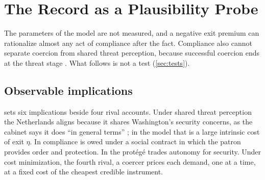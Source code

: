 \section{The Record as a Plausibility Probe}\label{sec:evidence}

The parameters of the model are not measured, and a negative exit premium can rationalize almost any act of compliance after the fact. Compliance also cannot separate coercion from shared threat perception, because successful coercion ends at the threat stage \citep{drezner2003hidden}. What follows is not a test (\cref{sec:tests}).

\subsection{Observable implications}\label{sec:predictions}

 sets six implications beside four rival accounts. Under shared threat perception the Netherlands aligns because it shares Washington's security concerns, as the cabinet says it does ``in general terms'' \citep[our translation]{tk2026match}; in the model that is a large intrinsic cost of exit $\eta$. In \citet{lake2009hierarchy} compliance is owed under a social contract in which the patron provides order and protection. In \citet{morrow1991alliances} the protégé trades autonomy for security. Under cost minimization, the fourth rival, a coercer prices each demand, one at a time, at a fixed cost of the cheapest credible instrument.

